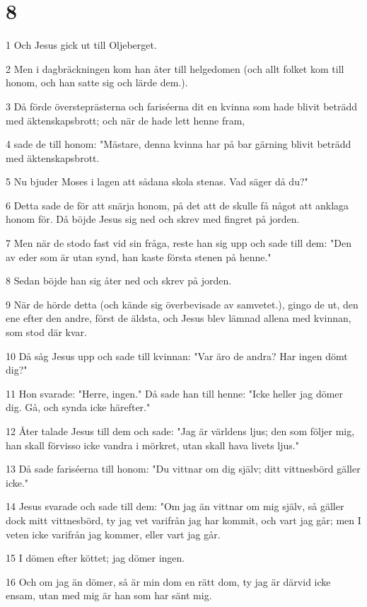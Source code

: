\chapter{8}

\par 1 Och Jesus gick ut till Oljeberget.
\par 2 Men i dagbräckningen kom han åter till helgedomen (och allt folket kom till honom, och han satte sig och lärde dem.).
\par 3 Då förde översteprästerna och fariséerna dit en kvinna som hade blivit beträdd med äktenskapsbrott; och när de hade lett henne fram,
\par 4 sade de till honom: "Mästare, denna kvinna har på bar gärning blivit beträdd med äktenskapsbrott.
\par 5 Nu bjuder Moses i lagen att sådana skola stenas. Vad säger då du?"
\par 6 Detta sade de för att snärja honom, på det att de skulle få något att anklaga honom för. Då böjde Jesus sig ned och skrev med fingret på jorden.
\par 7 Men när de stodo fast vid sin fråga, reste han sig upp och sade till dem: "Den av eder som är utan synd, han kaste första stenen på henne."
\par 8 Sedan böjde han sig åter ned och skrev på jorden.
\par 9 När de hörde detta (och kände sig överbevisade av samvetet.), gingo de ut, den ene efter den andre, först de äldsta, och Jesus blev lämnad allena med kvinnan, som stod där kvar.
\par 10 Då såg Jesus upp och sade till kvinnan: "Var äro de andra? Har ingen dömt dig?"
\par 11 Hon svarade: "Herre, ingen." Då sade han till henne: "Icke heller jag dömer dig. Gå, och synda icke härefter."
\par 12 Åter talade Jesus till dem och sade: "Jag är världens ljus; den som följer mig, han skall förvisso icke vandra i mörkret, utan skall hava livets ljus."
\par 13 Då sade fariséerna till honom: "Du vittnar om dig själv; ditt vittnesbörd gäller icke."
\par 14 Jesus svarade och sade till dem: "Om jag än vittnar om mig själv, så gäller dock mitt vittnesbörd, ty jag vet varifrån jag har kommit, och vart jag går; men I veten icke varifrån jag kommer, eller vart jag går.
\par 15 I dömen efter köttet; jag dömer ingen.
\par 16 Och om jag än dömer, så är min dom en rätt dom, ty jag är därvid icke ensam, utan med mig är han som har sänt mig.
